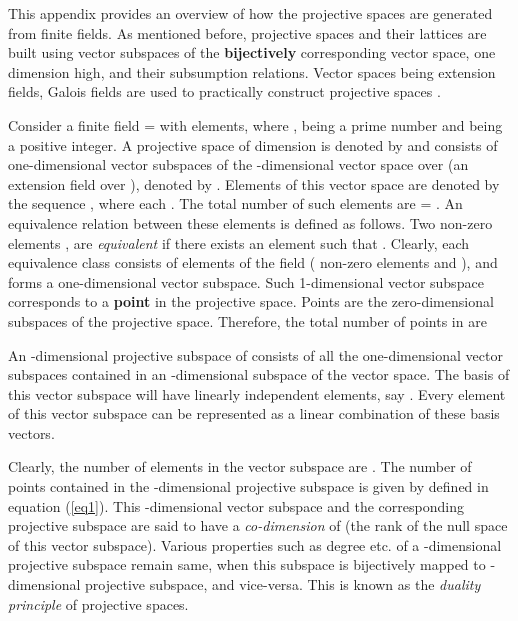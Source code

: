 \documentclass[12pt]{article}
\begin{document}
This appendix provides an overview of how the projective spaces are generated
from finite fields.  As mentioned before, projective spaces and their
lattices are built using vector subspaces of the \textbf{bijectively}
corresponding vector space, one dimension high, and their subsumption
relations. Vector spaces being extension fields, Galois fields are used to
practically construct projective spaces \cite{expanders}.

Consider a finite field {\large } = {\large }
with {\large } elements, where {\large
}, {\large } being a prime number
and {\large } being a positive integer. A projective space of
dimension {\large } is denoted by {\large
} and consists of one-dimensional
vector subspaces of
the {\large }-dimensional vector space over {\large
} (an extension field over {\large }), denoted by
{\large }. Elements of this vector space are denoted by
the sequence {\large }, where each {\large
}. The total number of such elements are
{\large } = {\large }. An
equivalence relation between these elements is defined as follows. Two
non-zero elements {\large }, {\large } are
\textit{equivalent} if there exists an element {\large }
{\large } such that {\large }. Clearly, each equivalence class consists of {\large
} elements of the field ({\large } non-zero
elements and {\large }), and forms a one-dimensional
vector subspace.
Such 1-dimensional vector subspace corresponds to a \textbf{point} in the projective
space. Points are the zero-dimensional subspaces of the projective space.
Therefore, the total number of points in {\large
} are

{\large

}

An {\large }-dimensional projective subspace of {\large
} consists of all the one-dimensional
vector subspaces contained in an {\large
}-dimensional subspace of the vector space.
The basis of this vector subspace will have {\large }
linearly independent elements, say {\large }.
Every element of this vector subspace can be represented as a linear combination
of these basis vectors.
{\large

}

Clearly, the number of elements in the vector subspace are {\large
}.  The number of points contained in the {\large
}-dimensional projective subspace is given by {\large
} defined in equation (\ref{eq1}). This {\large
}-dimensional vector subspace and the corresponding
projective subspace are said to have a \textit{co-dimension} of {\large
} (the rank of the null space of this vector
subspace). Various properties such as degree etc. of a {\large
}-dimensional projective subspace remain same, when
this
subspace is bijectively mapped to {\large }-dimensional
projective subspace, and vice-versa. This is known as the \textit{duality
principle} of projective spaces.
\end{document}
